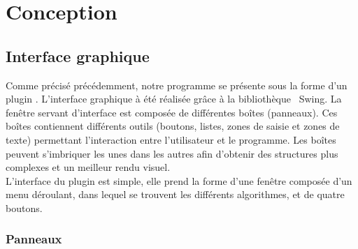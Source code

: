 
\newcommand{\black}{\color{black}}
\newcommand{\blue}{\color{blue}}

\chapter{Conception}

\section{Interface graphique}

Comme précisé précédemment, notre programme se présente sous la forme d'un plugin \imj . L'interface graphique à été réalisée grâce à la bibliothèque  \java ~Swing. %
La fenêtre servant d'interface est composée de différentes boîtes (panneaux). Ces boîtes contiennent différents outils (boutons, listes, zones de saisie et zones de texte) permettant l'interaction entre l'utilisateur et le programme. Les boîtes peuvent s'imbriquer les unes dans les autres afin d'obtenir des structures plus complexes et un meilleur rendu visuel. \\
L'interface du plugin est simple, elle prend la forme d'une fenêtre composée d'un menu déroulant, dans lequel se trouvent les différents algorithmes, et de quatre boutons. 

\subsection{Panneaux}

